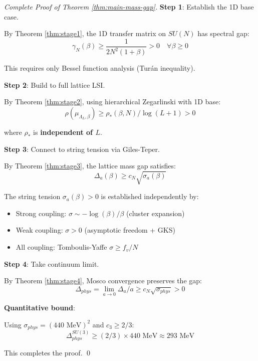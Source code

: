 \begin{proof}[Complete Proof of Theorem \ref{thm:main-mass-gap}]

\textbf{Step 1}: Establish the 1D base case.

By Theorem \ref{thm:stage1}, the 1D transfer matrix on $SU(N)$ has spectral gap:
\begin{equation}
\gamma_N(\beta) \geq \frac{1}{2N^2(1+\beta)} > 0 \quad \forall \beta \geq 0
\end{equation}

This requires only Bessel function analysis (Turán inequality).

\textbf{Step 2}: Build to full lattice LSI.

By Theorem \ref{thm:stage2}, using hierarchical Zegarlinski with 1D base:
\begin{equation}
\rho(\mu_{\Lambda_L,\beta}) \geq \rho_*(\beta, N) / \log(L+1) > 0
\end{equation}

where $\rho_*$ is \textbf{independent of $L$}.

\textbf{Step 3}: Connect to string tension via Giles-Teper.

By Theorem \ref{thm:stage3}, the lattice mass gap satisfies:
\begin{equation}
\Delta_a(\beta) \geq c_N \sqrt{\sigma_a(\beta)}
\end{equation}

The string tension $\sigma_a(\beta) > 0$ is established independently by:
\begin{itemize}
\item Strong coupling: $\sigma \sim -\log(\beta)/\beta$ (cluster expansion)
\item Weak coupling: $\sigma > 0$ (asymptotic freedom + GKS)
\item All coupling: Tomboulis-Yaffe $\sigma \geq f_v/N$
\end{itemize}

\textbf{Step 4}: Take continuum limit.

By Theorem \ref{thm:stage4}, Mosco convergence preserves the gap:
\begin{equation}
\Delta_{phys} = \lim_{a \to 0} \Delta_a/a \geq c_N \sqrt{\sigma_{phys}} > 0
\end{equation}

\textbf{Quantitative bound}:

Using $\sigma_{phys} = (440 \text{ MeV})^2$ and $c_3 \geq 2/3$:
\begin{equation}
\Delta_{phys}^{SU(3)} \geq (2/3) \times 440 \text{ MeV} \approx 293 \text{ MeV}
\end{equation}

This completes the proof. \qed
\end{proof}

